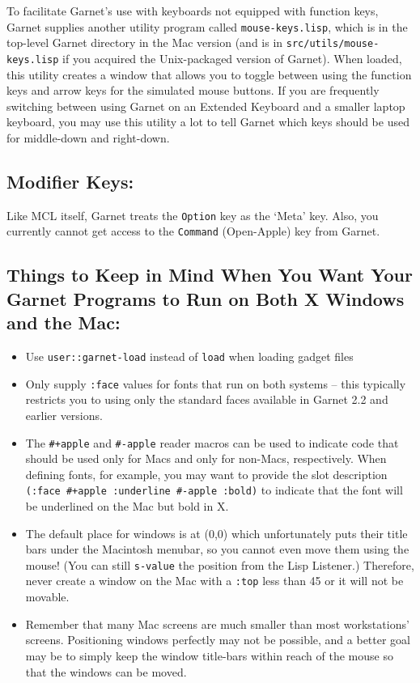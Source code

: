 \documentclass{report}
\begin{document}
 To facilitate Garnet's use with keyboards not
equipped with function keys, Garnet supplies another utility program
called \texttt{mouse-keys.lisp}, which is in the top-level Garnet
directory in the Mac version (and is in \texttt{src/utils/mouse-keys.lisp}
if you acquired the Unix-packaged version of Garnet).  When loaded,
this utility creates a window that allows you to toggle between using
the function keys and arrow keys for the simulated mouse buttons.  If
you are frequently switching between using Garnet on an Extended
Keyboard and a smaller laptop keyboard, you may use this utility a lot
to tell Garnet which keys should be used for middle-down and
right-down.

\subsection{Modifier Keys:}
Like MCL itself, Garnet treats the \texttt{Option} key as the `Meta' key.
Also, you currently cannot get access to the \texttt{Command} (Open-Apple)
key from Garnet.

\subsection{Things to Keep in Mind When You Want Your Garnet Programs
  to Run on Both X Windows and the Mac:}
\begin{itemize}
\item Use \texttt{user::garnet-load} instead of \texttt{load} when loading
  gadget files
  
\item Only supply \texttt{:face} values for fonts that run on both systems
  -- this typically restricts you to using only the standard faces
  available in Garnet 2.2 and earlier versions.
  
\item The \texttt{\#+apple} and \texttt{\#-apple} reader macros can be used to
  indicate code that should be used only for Macs and only for
  non-Macs, respectively.  When defining fonts, for example, you may
  want to provide the slot description \texttt{(:face \#+apple :underline
    \#-apple :bold)} to indicate that the font will be underlined on
  the Mac but bold in X.
  
\item The default place for windows is at (0,0) which unfortunately
  puts their title bars under the Macintosh menubar, so you cannot
  even move them using the mouse!  (You can still \texttt{s-value} the
  position from the Lisp Listener.)  Therefore, never create a window
  on the Mac with a \texttt{:top} less than 45 or it will not be movable.
  
\item Remember that many Mac screens are much smaller than most
  workstations' screens.  Positioning windows perfectly may not be
  possible, and a better goal may be to simply keep the window
  title-bars within reach of the mouse so that the windows can be
  moved.
\end{itemize}
\end{document}
